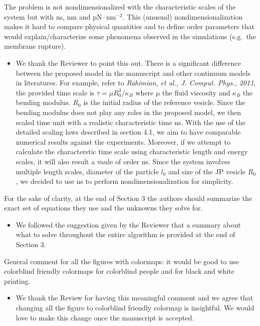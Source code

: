 \documentclass[11pt]{article}
\newcommand{\comment}[1]{{\color{blue} #1}}
\begin{document}
\noindent
\comment{The problem is not nondimensionalized with the characteristic
scales of the system but with ns, nm and $\text{pN} \cdot
\text{nm}^{-2}$. This (unusual) nondimensionalization makes it hard to
compare physical quantities and to define order parameters that would
explain/characterize some phenomena observed in the simulations
(e.g.~the membrane rupture).}

\begin{itemize}
  \item We thank the Reviewer to point this out. There is a significant difference between 
the proposed model in the manuscript and other continuum models in literatures. For example, refer to \emph{Rahimian, et al., J. Comput. Phys., 2011}, the 
provided time scale is $\tau = \mu R_0^3/\kappa_B$ where $\mu$ the fluid viscosity and $\kappa_B$ the bending modulus. $R_0$ is the initial radius of the reference vesicle. Since the bending modulus does not play any roles in the proposed model, we then scaled time unit with a realistic characteristic time ns. With the use of the detailed scaling laws described in section 4.1, we aim to have comparable
numerical results against the experiments. Moreover, if we attempt to calculate the characterstic 
time scale using characteristic length and energy scales, it will also result a vaule of order ns. 
Since the system involves multiple length scales, diameter of the particle $l_0$ and size of the JP
vesicle $R_0$, we decided to use ns to perform nondimensionalization for simplicity.
\end{itemize}

\noindent
\comment{For the sake of clarity, at the end of Section 3 the authors
should summarize the exact set of equations they use and the unknowns
they solve for.}
\begin{itemize}
  \item We followed the suggestion given by the Reviewer that a summary about what to solve throughout the entire algorithm is provided at the end of Section 3.
\end{itemize}

\noindent
\comment{General comment for all the figures with colormaps: it would be
good to use colorblind friendly colormaps for colorblind people and for
black and white printing.}
\begin{itemize}
  \item We thank the Review for having this meaningful comment and we agree that changing all the figure 
to colorblind friendly colormap is insightful. We would love to make this change once the manuscript is accepted.
\end{itemize}
\end{document}
